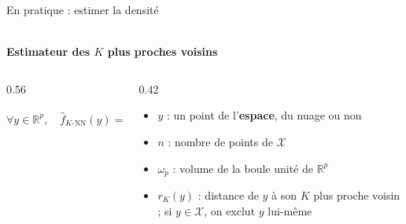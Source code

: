 \begin{frame}{En pratique : estimer la densité}
    \begin{center}
         \\[4pt]
        \normalsize \textbf{Estimateur des $K$ plus proches voisins} 
    \end{center}

    \vspace{0.4cm}

    \begin{columns}[c, onlytextwidth]
        \begin{column}{0.56\textwidth}
            \begin{center}
                {\large{} $\forall y \in \mathbb{R}^p, \quad \widehat{f}_{K\text{-NN}}(y) = \dfrac{K}{n \, \omega_p \, r_K(y)^p}$}

                \vspace{1.0cm}

            \end{center}
        \end{column}
        \begin{column}{0.42\textwidth}
            \begin{itemize}
                \setlength{\itemsep}{8pt}
                \item \textbf{$y$} : un point de l'\textbf{espace}, du nuage ou non
                \item \textbf{$n$} : nombre de points de $\mathcal{X}$
                \item \textbf{$\omega_p$} : volume de la boule unité de $\mathbb{R}^p$
                \item \textbf{$r_K(y)$} : distance de $y$ à son $K$ plus proche voisin ; si $y\in\mathcal X$, on exclut $y$ lui-même
            \end{itemize}
        \end{column}
    \end{columns}
\end{frame}

